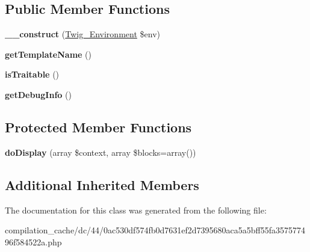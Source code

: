 \subsection*{Public Member Functions}
\begin{DoxyCompactItemize}
\item 
\hypertarget{class_____twig_template__dc440ac530df574fb0d7631ef2d7395680aca5a5bff55fa357577496f584522a_a4f8326243132c1450a81e0a817aa1be7}{}{\bfseries \+\_\+\+\_\+construct} (\hyperlink{class_twig___environment}{Twig\+\_\+\+Environment} \$env)\label{class_____twig_template__dc440ac530df574fb0d7631ef2d7395680aca5a5bff55fa357577496f584522a_a4f8326243132c1450a81e0a817aa1be7}

\item 
\hypertarget{class_____twig_template__dc440ac530df574fb0d7631ef2d7395680aca5a5bff55fa357577496f584522a_a621a3ccd148ed8b9e937da6959c98f39}{}{\bfseries get\+Template\+Name} ()\label{class_____twig_template__dc440ac530df574fb0d7631ef2d7395680aca5a5bff55fa357577496f584522a_a621a3ccd148ed8b9e937da6959c98f39}

\item 
\hypertarget{class_____twig_template__dc440ac530df574fb0d7631ef2d7395680aca5a5bff55fa357577496f584522a_aa9eb89be270f6afc256ef5e272b78a63}{}{\bfseries is\+Traitable} ()\label{class_____twig_template__dc440ac530df574fb0d7631ef2d7395680aca5a5bff55fa357577496f584522a_aa9eb89be270f6afc256ef5e272b78a63}

\item 
\hypertarget{class_____twig_template__dc440ac530df574fb0d7631ef2d7395680aca5a5bff55fa357577496f584522a_abd0ecb0136f4228db2bd963bfc1e20d7}{}{\bfseries get\+Debug\+Info} ()\label{class_____twig_template__dc440ac530df574fb0d7631ef2d7395680aca5a5bff55fa357577496f584522a_abd0ecb0136f4228db2bd963bfc1e20d7}

\end{DoxyCompactItemize}
\subsection*{Protected Member Functions}
\begin{DoxyCompactItemize}
\item 
\hypertarget{class_____twig_template__dc440ac530df574fb0d7631ef2d7395680aca5a5bff55fa357577496f584522a_adb62b7c226e07d30f836ed16158d924f}{}{\bfseries do\+Display} (array \$context, array \$blocks=array())\label{class_____twig_template__dc440ac530df574fb0d7631ef2d7395680aca5a5bff55fa357577496f584522a_adb62b7c226e07d30f836ed16158d924f}

\end{DoxyCompactItemize}
\subsection*{Additional Inherited Members}


The documentation for this class was generated from the following file\+:\begin{DoxyCompactItemize}
\item 
compilation\+\_\+cache/dc/44/0ac530df574fb0d7631ef2d7395680aca5a5bff55fa357577496f584522a.\+php\end{DoxyCompactItemize}
